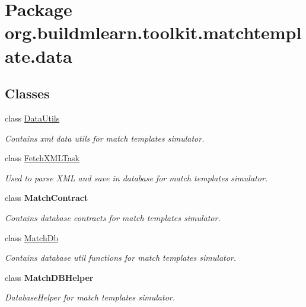 \hypertarget{namespaceorg_1_1buildmlearn_1_1toolkit_1_1matchtemplate_1_1data}{}\section{Package org.\+buildmlearn.\+toolkit.\+matchtemplate.\+data}
\label{namespaceorg_1_1buildmlearn_1_1toolkit_1_1matchtemplate_1_1data}
\subsection*{Classes}
\begin{DoxyCompactItemize}
\item 
class \hyperlink{classorg_1_1buildmlearn_1_1toolkit_1_1matchtemplate_1_1data_1_1DataUtils}{Data\+Utils}
\begin{DoxyCompactList}\small\item\em Contains xml data utils for match template\textquotesingle{}s simulator. \end{DoxyCompactList}\item 
class \hyperlink{classorg_1_1buildmlearn_1_1toolkit_1_1matchtemplate_1_1data_1_1FetchXMLTask}{Fetch\+X\+M\+L\+Task}
\begin{DoxyCompactList}\small\item\em Used to parse X\+ML and save in database for match template\textquotesingle{}s simulator. \end{DoxyCompactList}\item 
class {\bfseries Match\+Contract}
\begin{DoxyCompactList}\small\item\em Contains database contracts for match template\textquotesingle{}s simulator. \end{DoxyCompactList}\item 
class \hyperlink{classorg_1_1buildmlearn_1_1toolkit_1_1matchtemplate_1_1data_1_1MatchDb}{Match\+Db}
\begin{DoxyCompactList}\small\item\em Contains database util functions for match template\textquotesingle{}s simulator. \end{DoxyCompactList}\item 
class {\bfseries Match\+D\+B\+Helper}
\begin{DoxyCompactList}\small\item\em Database\+Helper for match template\textquotesingle{}s simulator. \end{DoxyCompactList}\item 

\end{DoxyCompactItemize}
